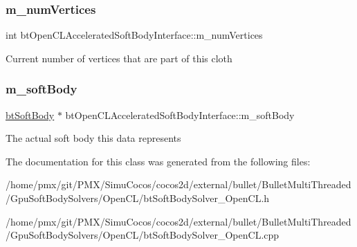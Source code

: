 \subsubsection{\texorpdfstring{m\+\_\+num\+Vertices}{m\_numVertices}}
{\footnotesize\ttfamily int bt\+Open\+C\+L\+Accelerated\+Soft\+Body\+Interface\+::m\+\_\+num\+Vertices\hspace{0.3cm}{\ttfamily [protected]}}

Current number of vertices that are part of this cloth \mbox{\label{classbtOpenCLAcceleratedSoftBodyInterface_a7454a985f23bd3957611a8bebb2ad4a8}} 
\subsubsection{\texorpdfstring{m\+\_\+soft\+Body}{m\_softBody}}
{\footnotesize\ttfamily \hyperlink{classbtSoftBody}{bt\+Soft\+Body} $\ast$ bt\+Open\+C\+L\+Accelerated\+Soft\+Body\+Interface\+::m\+\_\+soft\+Body\hspace{0.3cm}{\ttfamily [protected]}}

The actual soft body this data represents 

The documentation for this class was generated from the following files\+:\begin{DoxyCompactItemize}
\item 
/home/pmx/git/\+P\+M\+X/\+Simu\+Cocos/cocos2d/external/bullet/\+Bullet\+Multi\+Threaded/\+Gpu\+Soft\+Body\+Solvers/\+Open\+C\+L/bt\+Soft\+Body\+Solver\+\_\+\+Open\+C\+L.\+h\item 
/home/pmx/git/\+P\+M\+X/\+Simu\+Cocos/cocos2d/external/bullet/\+Bullet\+Multi\+Threaded/\+Gpu\+Soft\+Body\+Solvers/\+Open\+C\+L/bt\+Soft\+Body\+Solver\+\_\+\+Open\+C\+L.\+cpp\end{DoxyCompactItemize}
